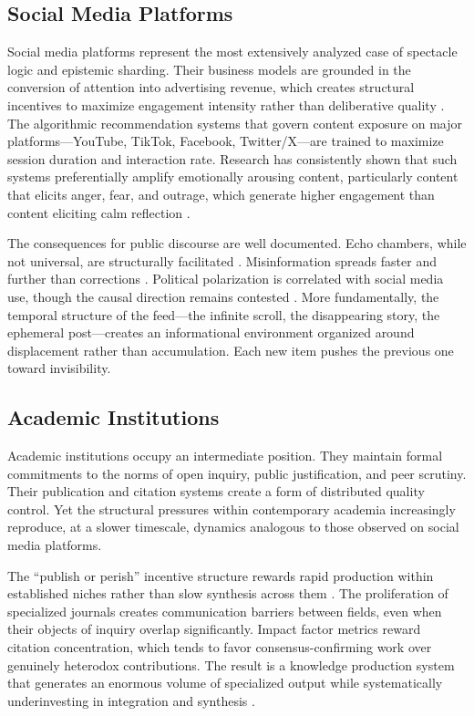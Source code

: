\documentclass[11pt]{article}
\begin{document}
\subsection{Social Media Platforms}

Social media platforms represent the most extensively analyzed case of spectacle logic and epistemic sharding. Their business models are grounded in the conversion of attention into advertising revenue, which creates structural incentives to maximize engagement intensity rather than deliberative quality \citep{Zuboff2019}. The algorithmic recommendation systems that govern content exposure on major platforms---YouTube, TikTok, Facebook, Twitter/X---are trained to maximize session duration and interaction rate. Research has consistently shown that such systems preferentially amplify emotionally arousing content, particularly content that elicits anger, fear, and outrage, which generate higher engagement than content eliciting calm reflection \citep{Brady2017}.

The consequences for public discourse are well documented. Echo chambers, while not universal, are structurally facilitated \citep{Sunstein2017}. Misinformation spreads faster and further than corrections \citep{Vosoughi2018}. Political polarization is correlated with social media use, though the causal direction remains contested \citep{Settle2018}. More fundamentally, the temporal structure of the feed---the infinite scroll, the disappearing story, the ephemeral post---creates an informational environment organized around displacement rather than accumulation. Each new item pushes the previous one toward invisibility.

\subsection{Academic Institutions}

Academic institutions occupy an intermediate position. They maintain formal commitments to the norms of open inquiry, public justification, and peer scrutiny. Their publication and citation systems create a form of distributed quality control. Yet the structural pressures within contemporary academia increasingly reproduce, at a slower timescale, dynamics analogous to those observed on social media platforms.

The ``publish or perish'' incentive structure rewards rapid production within established niches rather than slow synthesis across them \citep{Smaldino2016}. The proliferation of specialized journals creates communication barriers between fields, even when their objects of inquiry overlap significantly. Impact factor metrics reward citation concentration, which tends to favor consensus-confirming work over genuinely heterodox contributions. The result is a knowledge production system that generates an enormous volume of specialized output while systematically underinvesting in integration and synthesis \citep{Gibbons1994}.
\end{document}
